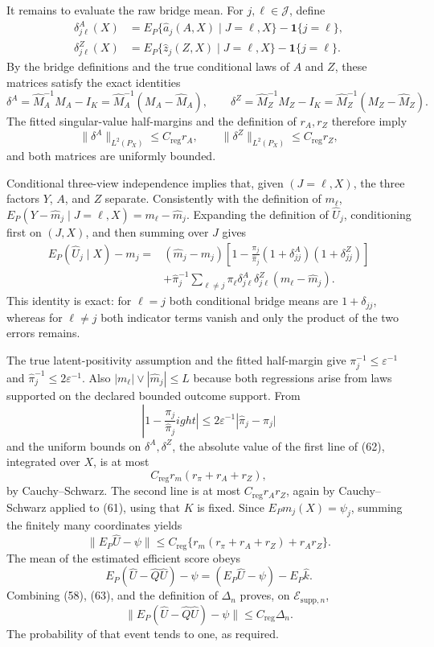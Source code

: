 It remains to evaluate the raw bridge mean.  For \(j,\ell\in\mathcal J\), define
\[
\begin{aligned}
 \delta^A_{j\ell}(X)
 &=E_P\{\widehat a_j(A,X)\mid J=\ell,X\}
   -\mathbf 1\{j=\ell\},\\
 \delta^Z_{j\ell}(X)
 &=E_P\{\widehat z_j(Z,X)\mid J=\ell,X\}
   -\mathbf 1\{j=\ell\}.
\end{aligned}
\tag{59}
\]
By the bridge definitions and the true conditional laws of \(A\) and \(Z\), these matrices satisfy the exact identities
\[
 \delta^A=\widehat M_A^{-1}M_A-I_K
 =\widehat M_A^{-1}(M_A-\widehat M_A),
 \qquad
 \delta^Z=\widehat M_Z^{-1}M_Z-I_K
 =\widehat M_Z^{-1}(M_Z-\widehat M_Z).
 \tag{60}
\]
The fitted singular-value half-margins and the definition of \(r_A,r_Z\) therefore imply
\[
 \|\delta^A\|_{L^2(P_X)}\leq C_{\mathrm{reg}}r_A,
 \qquad
 \|\delta^Z\|_{L^2(P_X)}\leq C_{\mathrm{reg}}r_Z,
 \tag{61}
\]
and both matrices are uniformly bounded.

Conditional three-view independence implies that, given \((J=\ell,X)\), the three factors \(Y\), \(A\), and \(Z\) separate.  Consistently with the definition of \(m_\ell\),
\(E_P(Y-\widehat m_j\mid J=\ell,X)=m_\ell-\widehat m_j\).  Expanding the definition of \(\widehat U_j\), conditioning first on \((J,X)\), and then summing over \(J\) gives
\[
\begin{aligned}
 E_P(\widehat U_j\mid X)-m_j
={}&(\widehat m_j-m_j)
 \left[1-\frac{\pi_j}{\widehat\pi_j}
 (1+\delta^A_{jj})(1+\delta^Z_{jj})\right]\\
&+\widehat\pi_j^{-1}\sum_{\ell\ne j}\pi_\ell
 \delta^A_{j\ell}\delta^Z_{j\ell}
 (m_\ell-\widehat m_j).
\end{aligned}
\tag{62}
\]
This identity is exact: for \(\ell=j\) both conditional bridge means are \(1+\delta_{jj}\), whereas for \(\ell\ne j\) both indicator terms vanish and only the product of the two errors remains.

The true latent-positivity assumption and the fitted half-margin give \(\pi_j^{-1}\leq\varepsilon^{-1}\) and \(\widehat\pi_j^{-1}\leq2\varepsilon^{-1}\).  Also \(|m_\ell|\vee|\widehat m_j|\leq L\) because both regressions arise from laws supported on the declared bounded outcome support.  From
\[
 \left|1-\frac{\pi_j}{\widehat\pi_j}
ight|
 \leq2\varepsilon^{-1}|\widehat\pi_j-\pi_j|
\]
and the uniform bounds on \(\delta^A,\delta^Z\), the absolute value of the first line of (62), integrated over \(X\), is at most
\[
 C_{\mathrm{reg}}r_m(r_\pi+r_A+r_Z),
\]
by Cauchy--Schwarz.  The second line is at most \(C_{\mathrm{reg}}r_Ar_Z\), again by Cauchy--Schwarz applied to (61), using that \(K\) is fixed.  Since \(E_Pm_j(X)=\psi_j\), summing the finitely many coordinates yields
\[
 \|E_P\widehat U-\psi\|
 \leq C_{\mathrm{reg}}
 \{r_m(r_\pi+r_A+r_Z)+r_Ar_Z\}.
 \tag{63}
\]
The mean of the estimated efficient score obeys
\[
 E_P(\widehat U-\widehat Q\widehat U)-\psi
 =(E_P\widehat U-\psi)-E_P\widehat k.
\]
Combining (58), (63), and the definition of \(\Delta_n\) proves, on \(\mathcal E_{\mathrm{supp},n}\),
\[
 \|E_P(\widehat U-\widehat Q\widehat U)-\psi\|
 \leq C_{\mathrm{reg}}\Delta_n.
 \tag{64}
\]
The probability of that event tends to one, as required.

